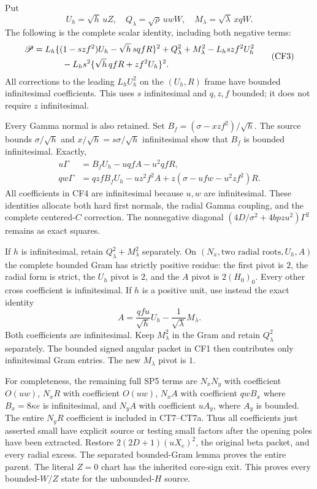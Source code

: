 Put
\[
 U_h=\sqrt h\,uZ,\quad Q_\lambda=\sqrt\rho\,uwW,
 \quad M_\lambda=\sqrt\lambda\,xqW.
\]
The following is the complete scalar identity, including both
negative terms:
\[
\begin{split}
 \mathscr P={}&L_h\{(1-szf^2)U_h-\sqrt h\,sqfR\}^2
       +Q_\lambda^2+M_\lambda^2-L_hszf^2U_h^2\\
 &\hspace{7mm}-L_hs^2\{\sqrt h\,qfR+zf^2U_h\}^2.
\end{split}                                                   \tag{CF3}
\]
All corrections to the leading $L_hU_h^2$ on the $(U_h,R)$
frame have bounded infinitesimal coefficients. This uses $s$ infinitesimal
and $q,z,f$ bounded; it does not require $z$ infinitesimal.

Every Gamma normal is also retained. Set
$B_f=(\sigma-xzf^2)/\sqrt h$. The source bounds
$\sigma/\sqrt h$ and $x/\sqrt h=s\sigma/\sqrt h$ infinitesimal
show that $B_f$ is bounded infinitesimal. Exactly,
\[
\begin{split}
 u\Gamma&=B_fU_h-uqfA-u^2qfR,\\
 qw\Gamma&=qzfB_fU_h-uz^2f^2A
                 +z(\sigma-ufw-u^2zf^2)R.
\end{split}                                                   \tag{CF4}
\]
All coefficients in CF4 are infinitesimal because $u,w$ are
infinitesimal. These identities allocate both hard first normals,
the radial Gamma coupling, and the complete centered-$C$ correction.
The nonnegative diagonal
$(4D/\sigma^2+4bpzu^2)\Gamma^2$ remains as exact squares.

If $h$ is infinitesimal, retain $Q_\lambda^2+M_\lambda^2$
separately. On $(N_x,\text{two radial roots},U_h,A)$ the complete
bounded Gram has strictly positive residue: the first pivot is $2$,
the radial form is strict, the $U_h$ pivot is $2$, and the $A$
pivot is $2(H_0)_0$. Every other cross coefficient is infinitesimal.
If $h$ is a positive unit, use instead the exact identity
\[
 A=\frac{qfu}{\sqrt h}U_h-\frac{1}{\sqrt\lambda}M_\lambda.
                                                               \tag{CF5}
\]
Both coefficients are infinitesimal. Keep $M_\lambda^2$ in the Gram
and retain $Q_\lambda^2$ separately. The bounded signed angular
packet in CF1 then contributes only infinitesimal Gram entries.
The new $M_\lambda$ pivot is $1$.

For completeness, the remaining full SP5 terms are $N_xN_y$ with
coefficient $O(uw)$, $N_xR$ with coefficient $O(uw)$,
$N_xA$ with coefficient $qwB_x$ where $B_x=8\kappa e$ is
infinitesimal, and $N_yA$ with coefficient $uA_y$, where $A_y$ is
bounded. The entire $N_yR$ coefficient is included in CT7--CT7a.
Thus all coefficients just asserted small have explicit source or
testing small factors after the opening poles have been extracted.
Restore $2(2D+1)(uX_e)^2$, the original beta packet, and every
radial excess. The separated bounded-Gram lemma proves the entire
parent. The literal $Z=0$ chart has the inherited core-sign exit.
This proves every bounded-$W/Z$ state for the unbounded-$H$ source.

